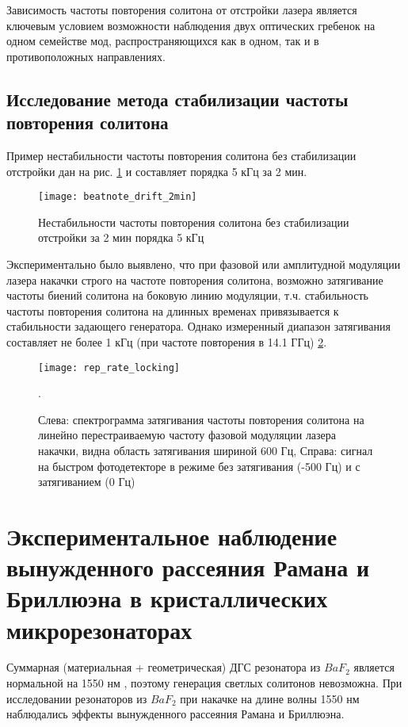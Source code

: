 Зависимость частоты повторения солитона от отстройки лазера является ключевым условием возможности наблюдения двух оптических гребенок на одном семействе мод, распространяющихся как в одном, так и в противоположных направлениях.

\subsection{Исследование метода стабилизации частоты повторения солитона} 

Пример нестабильности частоты повторения солитона без стабилизации отстройки дан на рис. \ref{beatnote_drift_2min} и составляет порядка 5 кГц за 2 мин.

\begin{figure}[ht]
\centering
  \texttt{[image: beatnote\_drift\_2min]}
  \caption{Нестабильности частоты повторения солитона без стабилизации отстройки за 2 мин порядка 5 кГц}
  \label{beatnote_drift_2min}
\end{figure}

Экспериментально было выявлено, что при фазовой или амплитудной модуляции лазера накачки строго на частоте повторения солитона, возможно затягивание частоты биений солитона на боковую линию модуляции, т.ч. стабильность частоты повторения солитона на длинных временах привязывается к стабильности задающего генератора. Однако измеренный диапазон затягивания составляет не более 1 кГц (при частоте повторения в 14.1 ГГц) \ref{rep_rate_locking}.

\begin{figure}[ht]
\centering
  \texttt{[image: rep\_rate\_locking]}
  \caption{Слева: спектрограмма затягивания частоты повторения солитона на линейно перестраиваемую частоту фазовой модуляции лазера накачки, видна область затягивания шириной 600 Гц, Справа: сигнал на быстром фотодетекторе в режиме без затягивания (-500 Гц) и с затягиванием (0 Гц)}.
  \label{rep_rate_locking}
\end{figure}


\section{Экспериментальное наблюдение вынужденного рассеяния Рамана и Бриллюэна в кристаллических микрорезонаторах}

Суммарная (материальная + геометрическая) ДГС резонатора из $BaF_2$ является нормальной на 1550 нм \cite{}, поэтому генерация светлых солитонов невозможна. При исследовании резонаторов из $BaF_2$ при накачке на длине волны 1550 нм наблюдались эффекты вынужденного рассеяния Рамана и Бриллюэна.

